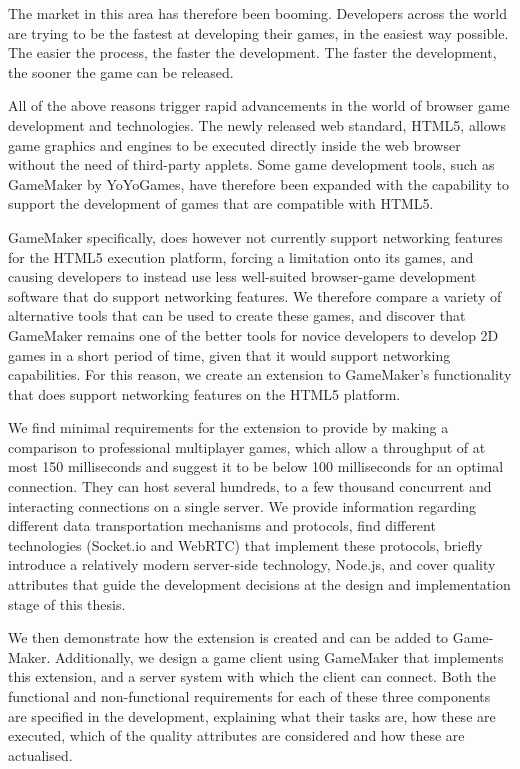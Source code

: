 \documentclass[bsc, 12pt, twoside, singlespacing, parskip, abbrevs, notimes, normalheadings, logo]{styles/infthesis}
\begin{document}
The market in this area has therefore been booming. Developers across the world are trying to be the fastest at developing their games, in the easiest way possible. The easier the process, the faster the development. The faster the development, the sooner the game can be released.

All of the above reasons trigger rapid advancements in the world of browser game development and technologies. The newly released web standard, HTML5, allows game graphics and engines to be executed directly inside the web browser without the need of third-party applets. Some game development tools, such as GameMaker by YoYoGames, have therefore been expanded with the capability to support the development of games that are compatible with HTML5.

GameMaker specifically, does however not currently support networking features for the HTML5 execution platform, forcing a limitation onto its games, and causing developers to instead use less well-suited browser-game development software that do support networking features. We therefore compare a variety of alternative tools that can be used to create these games, and discover that GameMaker remains one of the better tools for novice developers to develop 2D games in a short period of time, given that it would support networking capabilities. For this reason, we create an extension to GameMaker's functionality that does support networking features on the HTML5 platform.

We find minimal requirements for the extension to provide by making a comparison to professional multiplayer games, which allow a throughput of at most 150 milliseconds and suggest it to be below 100 milliseconds for an optimal connection. They can host several hundreds, to a few thousand concurrent and interacting connections on a single server. We provide information regarding different data transportation mechanisms and protocols, find different technologies (Socket.io and WebRTC) that implement these protocols, briefly introduce a relatively modern server-side technology, Node.js, and cover quality attributes that guide the development decisions at the design and implementation stage of this thesis.

We then demonstrate how the extension is created and can be added to Game-Maker. Additionally, we design a game client using GameMaker that implements this extension, and a server system with which the client can connect. Both the functional and non-functional requirements for each of these three components are specified in the development, explaining what their tasks are, how these are executed, which of the quality attributes are considered and how these are actualised.
\end{document}
